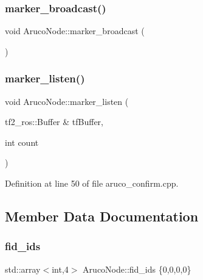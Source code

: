 \mbox{\label{class_aruco_node_adb4d7fb3af40cb83ae69be077c589558}} 
\subsubsection{\texorpdfstring{marker\+\_\+broadcast()}{marker\_broadcast()}}
{\footnotesize\ttfamily void Aruco\+Node\+::marker\+\_\+broadcast (\begin{DoxyParamCaption}{ }\end{DoxyParamCaption})}

\mbox{\label{class_aruco_node_ad79fd951057c9a40f34fc159363fbd94}} 
\subsubsection{\texorpdfstring{marker\+\_\+listen()}{marker\_listen()}}
{\footnotesize\ttfamily void Aruco\+Node\+::marker\+\_\+listen (\begin{DoxyParamCaption}\item[{tf2\+\_\+ros\+::\+Buffer \&}]{tf\+Buffer,  }\item[{int}]{count }\end{DoxyParamCaption})}



Definition at line 50 of file aruco\+\_\+confirm.\+cpp.



\subsection{Member Data Documentation}
\mbox{\label{class_aruco_node_aa64bc8aad47d7569e315f5045ecaa7ac}} 
\subsubsection{\texorpdfstring{fid\+\_\+ids}{fid\_ids}}
{\footnotesize\ttfamily std\+::array$<$int,4$>$ Aruco\+Node\+::fid\+\_\+ids \{0,0,0,0\}}



